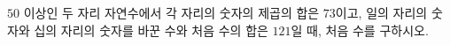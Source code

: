 $50$ 이상인 두 자리 자연수에서 각 자리의 숫자의 제곱의 합은 $73$이고, 일의 자리의 숫자와 십의 자리의 숫자를 바꾼 수와 처음 수의 합은 $121$일 때, 처음 수를 구하시오.
